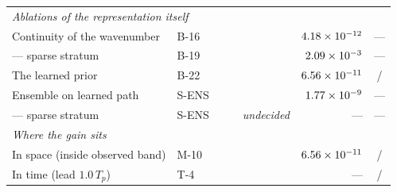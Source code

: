 \documentclass[review]{elsarticle}
\begin{document}
\begin{table}[!htbp]
\begin{tabular}{llccrrc}
\midrule
\multicolumn{7}{l}{\emph{Ablations of the representation itself}} \\
Continuity of the wavenumber & B-16 & \BSixteenN{} & \BSixteenBetter{} & \BSixteenRel{} & $4.18\times 10^{-12}{}$ & --- \\
\quad --- sparse stratum & B-19 & \BNineteenN{} & \BNineteenBetter{} & \BNineteenRel{} & $2.09\times 10^{-3}{}$ & --- \\
The learned prior & B-22 & \BTwentyTwoN{} & \BTwentyTwoBetter{} & \BTwentyTwoRel{} & $6.56\times 10^{-11}{}$ & \BTwentyTwoAnaZero{}/\BTwentyTwoN{} \\
Ensemble on learned path & S-ENS & \SEnsN{} & \SEnsBetter{} & \SEnsRel{} & $1.77\times 10^{-9}{}$ & --- \\
\quad --- sparse stratum & S-ENS & \SEnsSparseN{} & \SEnsSparseBetter{} & \emph{undecided} & --- & --- \\
\midrule
\multicolumn{7}{l}{\emph{Where the gain sits}} \\
In space (inside observed band) & M-10 & \MTenN{} & \MTenBetter{} & \MTenRel{} & $6.56\times 10^{-11}{}$ & \MTenCmp{}/\MTenN{} \\
In time (lead $1.0\,T_p$) & T-4 & \TFourN{} & \TFourBetter{} & \TFourRel{} & --- & \TFourCmp{}/\TFourN{} \\
\bottomrule
\end{tabular}
\end{table}

\end{document}
